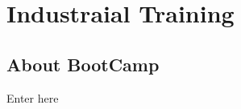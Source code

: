\documentclass[12pt, a4paper, oneside]{Thesis} %
\begin{document}

\chapter{Industraial Training} %

\label{Chapter0} %


\section*{ About BootCamp}
 Enter here 
 




\mainmatter %

\pagestyle{fancy} %



% 
% 
% 
% 



\appendix %

\end{document}
